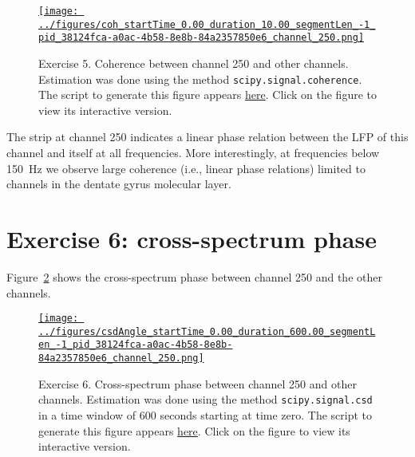 \documentclass[12pt]{article}
\begin{document}
\begin{figure}[H]
    \begin{center}
        \href{https://www.gatsby.ucl.ac.uk/~rapela/neuroinformatics/2023/ws3/figures/coh_startTime_0.00_duration_10.00_segmentLen_-1_pid_38124fca-a0ac-4b58-8e8b-84a2357850e6_channel_250.html}{\texttt{[image: ../figures/coh\_startTime\_0.00\_duration\_10.00\_segmentLen\_-1\_pid\_38124fca-a0ac-4b58-8e8b-84a2357850e6\_channel\_250.png]}}

        \caption{Exercise 5. Coherence between channel 250 and other channels.
        Estimation was done using the method \texttt{scipy.signal.coherence}.
        The script to generate this figure appears
        \href{https://github.com/joacorapela/neuroinformatics23/blob/master/worksheets/ws3/mySolution/code/scripts/doPlotCoherence.py}{here}.
        Click on the figure to view its interactive version.}

                \label{fig:coherenceChannel250WithOthers}

            \end{center}
        \end{figure}

The strip at channel 250 indicates a linear phase relation between the LFP of
this channel and itself at all frequencies. More interestingly, at frequencies
below 150~Hz we observe large coherence (i.e., linear phase relations) limited
to channels in the dentate gyrus molecular layer.

\section*{Exercise 6: cross-spectrum phase}

Figure~\ref{fig:crossSpectrumPhaseChannel250WithOthers} shows the
cross-spectrum phase between
channel 250 and the other channels.

\begin{figure}[H]
    \begin{center}
        \href{https://www.gatsby.ucl.ac.uk/~rapela/neuroinformatics/2023/ws3/figures/csdAngle_startTime_0.00_duration_600.00_segmentLen_-1_pid_38124fca-a0ac-4b58-8e8b-84a2357850e6_channel_250.html}{\texttt{[image: ../figures/csdAngle\_startTime\_0.00\_duration\_600.00\_segmentLen\_-1\_pid\_38124fca-a0ac-4b58-8e8b-84a2357850e6\_channel\_250.png]}}

        \caption{Exercise 6. Cross-spectrum phase between channel 250 and other
        channels. Estimation was done using the method
        \texttt{scipy.signal.csd} in a time window of 600 seconds starting at
        time zero.  The script to generate this figure appears
        \href{https://github.com/joacorapela/neuroinformatics23/blob/master/worksheets/ws3/mySolution/code/scripts/doPlotCrossSpectrumPhase.py}{here}.
        Click on the figure to view its interactive version.}

        \label{fig:crossSpectrumPhaseChannel250WithOthers}

        \end{center}
\end{figure}
\end{document}

